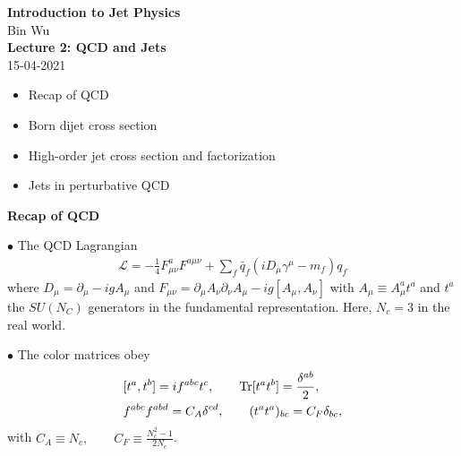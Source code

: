 \documentclass[9pt,a4paper,unknownkeysallowed,xcolor=dvipsnames,aspectratio=43]{beamer}
\begin{document}
\begin{frame}
\vspace*{\fill}
\begin{center}
{\Huge\bf\color{darkred} Introduction to Jet Physics}\\
\vspace{4mm}
    Bin Wu\\
    \vspace{8mm}
    {\bf\Large Lecture 2: QCD and Jets}\\\vspace{4mm}
    {\color{darkblue} 15-04-2021}
\end{center}
\vspace{4mm}
\begin{itemize}
    \item[\color{darkred}\Large\bullet] Recap of QCD
    \vspace{2mm}
    \item[\color{darkred}\Large\bullet] Born dijet cross section
    \vspace{2mm}
    \item[\color{darkred}\Large\bullet] High-order jet cross section and factorization
    \vspace{2mm}
    \item[\color{darkred}\Large\bullet] Jets in perturbative QCD

\end{itemize}
\vspace*{\fill}
\end{frame}
%
%
\begin{frame}{\bf\huge Recap of QCD}

{\color{darkred}\Large$\bullet$} {\color{darkred} The QCD Lagrangian}\\
\begin{align}
    \mathcal{L}=-\frac{1}{4}F^a_{\mu\nu}F^{a\mu\nu}+\sum\limits_f\bar{q}_f(iD_\mu\gamma^\mu-m_f)q_f
\end{align}
where $D_\mu=\partial_\mu-ig A_\mu$ and $F_{\mu\nu}=\partial_\mu A_\nu \partial_\nu A_\mu-ig[A_\mu,A_\nu]$ with $A_\mu\equiv A^a_\mu t^a$ and $t^a$ the $SU(N_C)$ generators in the fundamental representation. Here, $N_c = 3$ in the real world.
\vspace{2mm}

{\color{darkred}\Large$\bullet$} The color matrices obey\\
\begin{align}
    &[t^a, t^b] = i f^{abc} t^c,\qquad\text{Tr}[t^a t^b]=\frac{\delta^{ab}}{2},\notag\\
    &f^{abc}f^{abd}=C_A \delta^{cd},\qquad (t^a t^a)_{bc} = C_F \delta_{bc},
\end{align}
with $C_A\equiv N_c,\qquad C_F \equiv \frac{N_c^2 -1 }{2 N_c}$.
\end{frame}
\end{document}
